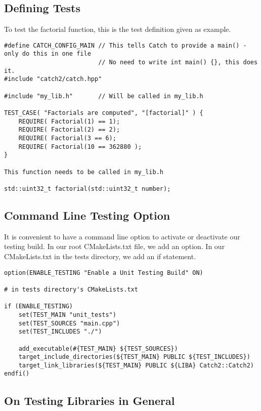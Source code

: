 \documentclass[openany]{report}
\begin{document}
\subsection{Defining Tests}

To test the factorial function, this is the test definition given as example.

\begin{verbatim}
#define CATCH_CONFIG_MAIN // This tells Catch to provide a main() - only do this in one file
                          // No need to write int main() {}, this does it. 
#include "catch2/catch.hpp"

#include "my_lib.h"       // Will be called in my_lib.h

TEST_CASE( "Factorials are computed", "[factorial]" ) {
    REQUIRE( Factorial(1) == 1);
    REQUIRE( Factorial(2) == 2);
    REQUIRE( Factorial(3 == 6);
    REQUIRE( Factorial(10 == 362880 );
}

This function needs to be called in my_lib.h

std::uint32_t factorial(std::uint32_t number);
\end{verbatim}


\subsection{Command Line Testing Option}

It is convenient to have a command line option to activate or deactivate our testing build. In our root CMakeLists.txt
file, we add an option. In our CMakeLists.txt in the tests directory, we add an if statement. 

\begin{verbatim}
option(ENABLE_TESTING "Enable a Unit Testing Build" ON) 

# in tests directory's CMakeLists.txt

if (ENABLE_TESTING)
    set(TEST_MAIN "unit_tests")
    set(TEST_SOURCES "main.cpp")
    set(TEST_INCLUDES "./")

    add_executable(#{TEST_MAIN} ${TEST_SOURCES})
    target_include_directories(${TEST_MAIN} PUBLIC ${TEST_INCLUDES})
    target_link_libraries(${TEST_MAIN} PUBLIC ${LIBA} Catch2::Catch2)
endfi()
\end{verbatim}


\subsection{On Testing Libraries in General}
\end{document}
